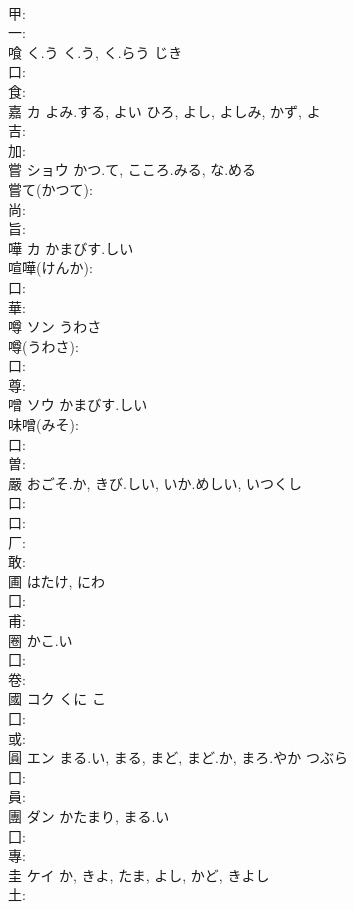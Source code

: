 \documentclass[8pt]{extreport}
\begin{document}
\begin{CJK}{UTF8}{min}
\\	甲: 
\\	一: 
\\	喰	く.う	く.う, く.らう	じき	
\\	口: 
\\	食: 
\\	嘉	カ	よみ.する, よい	ひろ, よし, よしみ, かず, よ	
\\	吉: 
\\	加: 
\\	嘗	ショウ	かつ.て, こころ.みる, な.める		
\\	嘗て(かつて): 
\\	尚: 
\\	旨: 
\\	嘩	カ	かまびす.しい		
\\	喧嘩(けんか): 
\\	口: 
\\	華: 
\\	噂	ソン	うわさ		
\\	噂(うわさ): 
\\	口: 
\\	尊: 
\\	噌	ソウ	かまびす.しい		
\\	味噌(みそ): 
\\	口: 
\\	曽: 
\\	嚴		おごそ.か, きび.しい, いか.めしい, いつくし				
\\	口: 
\\	口: 
\\	厂: 
\\	敢: 
\\	圃		はたけ, にわ				
\\	囗: 
\\	甫: 
\\	圈		かこ.い				
\\	囗: 
\\	卷: 
\\	國	コク	くに	こ	
\\	囗: 
\\	或: 
\\	圓	エン	まる.い, まる, まど, まど.か, まろ.やか	つぶら	
\\	囗: 
\\	員: 
\\	團	ダン	かたまり, まる.い		
\\	囗: 
\\	專: 
\\	圭	ケイ		か, きよ, たま, よし, かど, きよし	
\\	土: 

\end{CJK}
\end{document}
